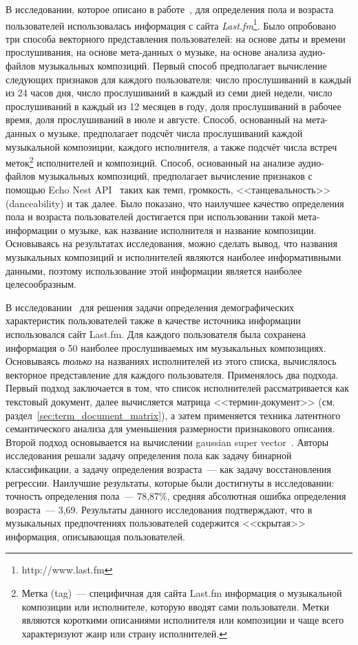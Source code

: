 В исследовании, которое описано в работе~\cite{liu2012inferring},
для определения пола и возраста пользователей использовалась информация
с сайта \textit{Last.fm}\footnote{http://www.last.fm}. Было опробовано три
способа векторного представления пользователей: на основе даты и
времени прослушивания, на основе мета-данных о музыке, на основе
анализа аудио-файлов музыкальных композиций. Первый способ
предполагает вычисление следующих признаков для каждого пользователя:
число прослушиваний в каждый из 24 часов дня, число прослушиваний
в каждый из семи дней недели, число прослушиваний в каждый из 12 месяцев
в году, доля прослушиваний в рабочее время, доля прослушиваний в июле и августе.
Способ, основанный на мета-данных о музыке, предполагает подсчёт числа
прослушиваний каждой музыкальной композиции, каждого исполнителя, а также
подсчёт числа встреч меток\footnote{Метка (tag)~--- специфичная для сайта
Last.fm информация о музыкальной композиции или исполнителе, которую
вводят сами пользователи. Метки являются короткими описаниями исполнителя 
или композиции и чаще всего характеризуют жанр или страну
исполнителей.} исполнителей и композиций. Способ, основанный на анализе
аудио-файлов музыкальных композиций, предполагает вычисление признаков
с помощью Echo Nest API~\cite{echonest} таких как темп, громкость,
<<танцевальность>> (danceability) и так далее. Было показано, что
наилучшее качество определения пола и возраста пользователей 
достигается при использовании такой мета-информации о музыке, как
название исполнителя и название композиции. Основываясь на
результатах исследования, можно сделать вывод, что названия
музыкальных композиций и исполнителей являются наиболее
информативными данными, поэтому использование этой информации
является наиболее целесообразным.

В исследовании~\cite{wu2014gender} для решения задачи определения
демографических характеристик пользователей также в качестве
источника информации использовался сайт Last.fm. Для каждого
пользователя была сохранена информация о 50 наиболее
прослушиваемых им музыкальных композициях. Основываясь 
\textit{только} на названиях исполнителей из этого списка, 
вычислялось векторное представление для каждого пользователя.
Применялось два подхода. Первый подход заключается в том, что
список исполнителей рассматривается как текстовый документ,
далее вычисляется матрица <<термин-документ>> (см.
раздел~\ref{sec:term_document_matrix}), а затем применяется
техника латентного семантического анализа для уменьшения
размерности признакового описания. Второй подход основывается
на вычислении gaussian super vector~\cite{campbell2006support}.
Авторы исследования решали задачу определения пола как задачу
бинарной классификации, а задачу определения возраста~--- как
задачу восстановления регрессии. Наилучшие результаты, которые
были достигнуты в исследовании: точность определения пола~---
78,87\%, средняя абсолютная ошибка определения возраста~--- 3,69.
Результаты данного исследования подтверждают, что в музыкальных
предпочтениях пользователей содержится <<скрытая>> информация,
описывающая пользователей.

